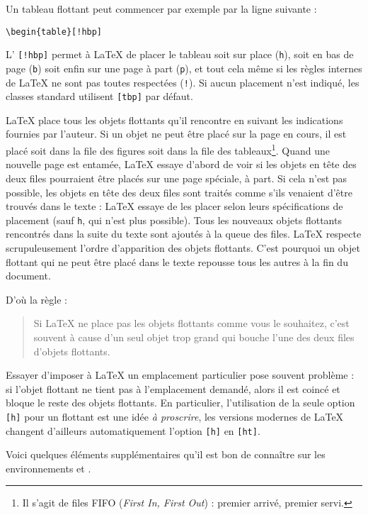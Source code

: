 Un tableau flottant peut commencer par exemple par la ligne suivante :
\begin{code}
\verb|\begin{table}[!hbp]|
\end{code}
\noindent L' \verb|[!hbp]| permet à \LaTeX{} de placer
le tableau soit sur place (\texttt{h}), soit en bas de page
(\texttt{b}) soit enfin sur une page à part (\texttt{p}), et
tout cela même si les règles internes de \LaTeX{} ne sont pas toutes
respectées (\texttt{!}). Si aucun placement n'est indiqué, les
classes standard utilisent \verb|[tbp]| par défaut.

\LaTeX{} place tous les objets flottants qu'il rencontre
en suivant les indications fournies par l'auteur. Si un objet ne peut
être placé sur la page en cours, il est placé soit dans la file des
figures soit dans la file des tableaux\footnote{Il s'agit de files
FIFO (\emph{First In, First Out}) : premier arrivé, premier servi.}.
Quand une nouvelle page est
entamée, \LaTeX{} essaye d'abord de voir si les objets en tête des
deux files pourraient être placés sur une page spéciale, à part.  Si
cela n'est pas possible, les objets en tête des deux files sont
traités comme s'ils venaient d'être trouvés dans le texte : \LaTeX{}
essaye de les placer selon leurs spécifications de placement (sauf
\texttt{h}, qui n'est plus possible). Tous les
nouveaux objets flottants rencontrés dans la suite du texte sont
ajoutés à la queue des files. \LaTeX{} respecte scrupuleusement
l'ordre d'apparition des objets flottants. C'est pourquoi un objet
flottant qui ne peut être placé dans le texte repousse tous les
autres à la fin du document.

D'où la règle :
\begin{quote}
Si \LaTeX{} ne place pas les objets flottants comme vous le souhaitez,
c'est souvent à cause d'un seul objet trop grand qui bouche l'une des
deux files d'objets flottants.
\end{quote}

Essayer d'imposer à \LaTeX{} un emplacement particulier pose souvent
problème : si l'objet flottant ne tient pas à l'emplacement demandé,
alors il est coincé et bloque le reste des objets flottants. En
particulier, l'utilisation de la seule option \verb+[h]+ pour un
flottant est une idée \emph{à proscrire}, les versions modernes de
\LaTeX{} changent d'ailleurs automatiquement l'option \verb+[h]+ en
\verb+[ht]+.

Voici quelques éléments supplémentaires qu'il est bon de connaître sur
les environnements  et .


